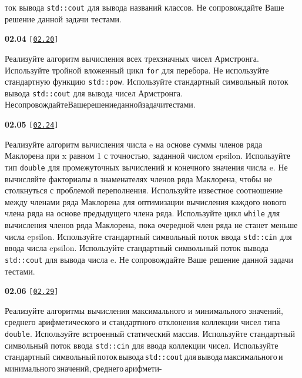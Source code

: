\documentclass[a4paper,12pt]{article}
\begin{document}
ток вывода \lstinline{std::cout} для вывода названий классов. Не сопровождайте Ваше решение данной задачи тестами.

\bigskip

{\large \textbf{02.04} \texttt{[\href{https://github.com/i-s-m-mipt/Education/blob/master/projects/examples/source/02.20.cpp}{\texttt{02.20}}]}}

\bigskip

Реализуйте алгоритм вычисления всех трехзначных чисел Армстронга. Используйте тройной вложенный цикл \lstinline{for} для перебора. Не используйте стандартную функцию \lstinline{std::pow}. Используйте стандартный символьный поток вывода \lstinline{std::cout} для вывода чисел Армстронга. Не\:сопровождайте\:Ваше\:решение\:данной\:задачи\:тестами.

\bigskip

{\large \textbf{02.05} \texttt{[\href{https://github.com/i-s-m-mipt/Education/blob/master/projects/examples/source/02.24.cpp}{\texttt{02.24}}]}}

\bigskip

Реализуйте алгоритм вычисления числа e на основе суммы членов ряда Маклорена при x равном 1 с точностью, заданной числом epsilon. Используйте тип \lstinline{double} для промежуточных вычислений и конечного значения числа e. Не вычисляйте факториалы в знаменателях членов ряда Маклорена, чтобы не столкнуться с проблемой переполнения. Используйте известное соотношение между членами ряда Маклорена для оптимизации вычисления каждого нового члена ряда на основе предыдущего члена ряда. Используйте цикл \lstinline{while} для вычисления членов ряда Маклорена, пока очередной член ряда не станет меньше числа epsilon. Используйте стандартный символьный поток ввода \lstinline{std::cin} для ввода числа epsilon. Используйте стандартный символьный поток вывода \lstinline{std::cout} для вывода числа e. Не сопровождайте Ваше решение данной задачи тестами.

\bigskip

{\large \textbf{02.06} \texttt{[\href{https://github.com/i-s-m-mipt/Education/blob/master/projects/examples/source/02.29.cpp}{\texttt{02.29}}]}}

\bigskip

Реализуйте алгоритмы вычисления максимального и минимального значений, среднего арифметического и стандартного отклонения коллекции чисел типа \lstinline{double}. Используйте встроенный статический массив. Используйте стандартный символьный поток ввода \lstinline{std::cin} для ввода коллекции чисел. Используйте стандартный символьный\,поток\,вывода\,\lstinline{std::cout}\,для\,вывода\,максимального\,и\,минимального\,значений,\,среднего\,арифмети- 
\end{document}
